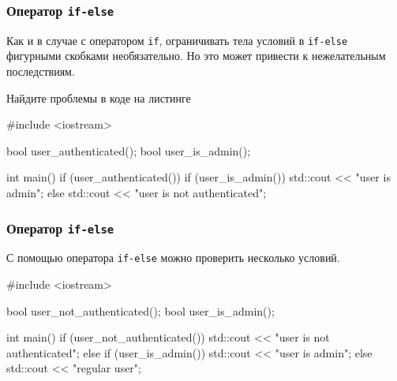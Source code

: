 \documentclass[compress, 8pt, aspectratio=169]{beamer}
\begin{document}
\begin{frame}[fragile]

    \frametitle{Оператор \texttt{if-else}}

    Как и в случае с оператором \verb|if|, ограничивать
    тела условий в \verb|if-else| фигурными скобками необязательно.
    Но это может привести к нежелательным последствиям.

    \begin{task}
        Найдите проблемы в коде на листинге
    \end{task}

    \begin{myinplacelisting}[minted language=cpp]
#include <iostream>

bool user_authenticated();
bool user_is_admin();

int main() {
    if (user_authenticated())
        if (user_is_admin())
            std::cout << "user is admin\n";
    else
        std::cout << "user is not authenticated\n";
}
    \end{myinplacelisting}

\end{frame}

\begin{frame}[fragile]

    \frametitle{Оператор \texttt{if-else}}

    С помощью оператора \verb|if-else| можно проверить несколько условий.

    \begin{myinplacelisting}[minted language=cpp]
#include <iostream>

bool user_not_authenticated();
bool user_is_admin();

int main() {
    if (user_not_authenticated()) {
        std::cout << "user is not authenticated\n";
    }
    else if (user_is_admin()) {
        std::cout << "user is admin\n";
    }
    else {
        std::cout << "regular user\n";
    }
}
    \end{myinplacelisting}

\end{frame}
\end{document}
